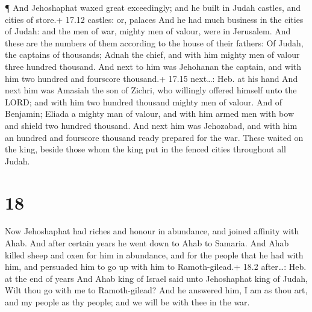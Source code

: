  ¶ And Jehoshaphat waxed great exceedingly; and he built in
Judah castles, and cities of store.+ 17.12 castles: or, palaces
 And he had much business in the cities of Judah: and the
men of war, mighty men of valour, were in Jerusalem.  And
these are the numbers of them according to the house of their fathers:
Of Judah, the captains of thousands; Adnah the chief, and with him
mighty men of valour three hundred thousand.  And next to
him was Jehohanan the captain, and with him two hundred and fourscore
thousand.+ 17.15 next\ldots: Heb. at his hand  And next him
was Amasiah the son of Zichri, who willingly offered himself unto the
LORD; and with him two hundred thousand mighty men of valour.
 And of Benjamin; Eliada a mighty man of valour, and with
him armed men with bow and shield two hundred thousand. 
And next him was Jehozabad, and with him an hundred and fourscore
thousand ready prepared for the war.  These waited on the
king, beside those whom the king put in the fenced cities throughout all
Judah.

\hypertarget{section-17}{%
\section{18}\label{section-17}}

 Now Jehoshaphat had riches and honour in abundance, and
joined affinity with Ahab.  And after certain years he went
down to Ahab to Samaria. And Ahab killed sheep and oxen for him in
abundance, and for the people that he had with him, and persuaded him to
go up with him to Ramoth-gilead.+ 18.2 after\ldots: Heb. at the end of
years  And Ahab king of Israel said unto Jehoshaphat king of
Judah, Wilt thou go with me to Ramoth-gilead? And he answered him, I am
as thou art, and my people as thy people; and we will be with thee in
the war.

